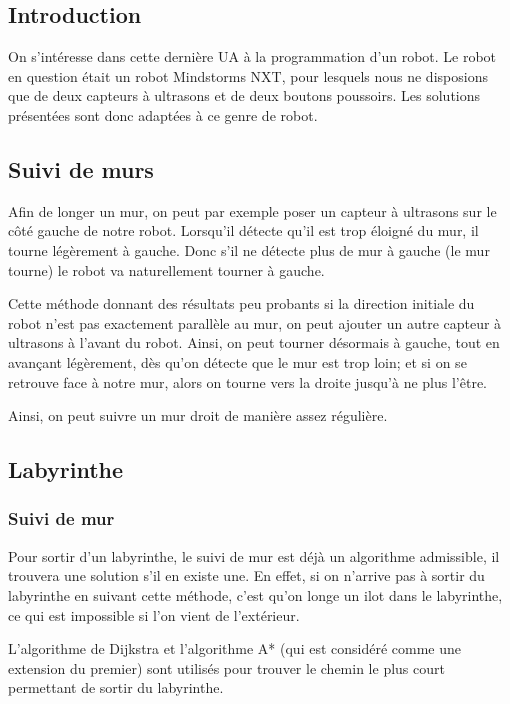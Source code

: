 \subsection{Introduction}

  On s'intéresse dans cette dernière UA à la programmation d'un robot. Le robot
  en question était un robot Mindstorms NXT, pour lesquels nous ne disposions
  que de deux capteurs à ultrasons et de deux boutons poussoirs. Les solutions
  présentées sont donc adaptées à ce genre de robot.

\subsection{Suivi de murs}
  Afin de longer un mur, on peut par exemple poser un capteur à ultrasons sur
  le côté gauche de notre robot. Lorsqu'il détecte qu'il est trop
  éloigné du mur, il tourne légèrement à gauche. Donc s'il ne détecte plus
  de mur à gauche (le mur tourne) le robot va naturellement tourner à gauche.

  Cette méthode donnant des résultats peu probants si la direction initiale du
  robot n'est pas exactement parallèle au mur, on peut ajouter un autre capteur
  à ultrasons à l'avant du robot. Ainsi, on peut tourner désormais à gauche,
  tout en avançant légèrement, dès qu'on détecte que le mur est trop loin; et
  si on se retrouve face à notre mur, alors on tourne vers la droite jusqu'à ne
  plus l'être.

  Ainsi, on peut suivre un mur droit de manière assez régulière.

\subsection{Labyrinthe}\label{sec:laby}
  \subsubsection{Suivi de mur}
    Pour sortir d'un labyrinthe, le suivi de mur est déjà un algorithme
    admissible, il trouvera une solution s'il en existe une. En effet, si on
    n'arrive pas à sortir du labyrinthe en suivant cette méthode, c'est qu'on
    longe un ilot dans le labyrinthe, ce qui est impossible si l'on vient
    de l'extérieur.

    L'algorithme de Dijkstra et l'algorithme A* (qui est considéré comme une
    extension du premier) sont utilisés pour trouver le chemin le plus court
    permettant de sortir du labyrinthe.

